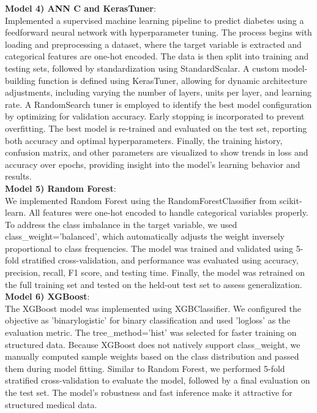 \documentclass[conference]{IEEEtran}
\begin{document}
\noindent
\textbf{Model 4) ANN C and KerasTuner}:\\
Implemented a supervised machine learning pipeline to predict diabetes using a feedforward neural network with hyperparameter tuning. The process begins with loading and preprocessing a dataset, where the target variable is extracted and categorical features are one-hot encoded. The data is then split into training and testing sets, followed by standardization using StandardScalar. A custom model-building function is defined using KerasTuner, allowing for dynamic architecture adjustments, including varying the number of layers, units per layer, and learning rate. A RandomSearch tuner is employed to identify the best model configuration by optimizing for validation accuracy. Early stopping is incorporated to prevent overfitting. The best model is re-trained and evaluated on the test set, reporting both accuracy and optimal hyperparameters. Finally, the training history, confusion matrix, and other parameters are visualized to show trends in loss and accuracy over epochs, providing insight into the model's learning behavior and results.\\

\noindent
\textbf{Model 5) Random Forest}:\\
We implemented Random Forest using the RandomForestClassifier from scikit-learn. All features were one-hot encoded to handle categorical variables properly. To address the class imbalance in the target variable, we used class\_weight='balanced', which automatically adjusts the weight inversely proportional to class frequencies. The model was trained and validated using 5-fold stratified cross-validation, and performance was evaluated using accuracy, precision, recall, F1 score, and testing time. Finally, the model was retrained on the full training set and tested on the held-out test set to assess generalization.\\

\noindent
\textbf{Model 6) XGBoost}:\\
The XGBoost model was implemented using XGBClassifier. We configured the objective as 'binary\:logistic' for binary classification and used 'logloss' as the evaluation metric. The tree\_method='hist' was selected for faster training on structured data. Because XGBoost does not natively support class\_weight, we manually computed sample weights based on the class distribution and passed them during model fitting. Similar to Random Forest, we performed 5-fold stratified cross-validation to evaluate the model, followed by a final evaluation on the test set. The model's robustness and fast inference make it attractive for structured medical data.\\
\end{document}

